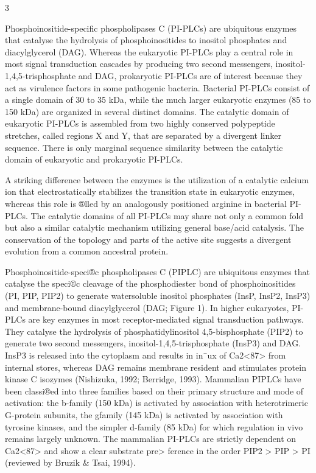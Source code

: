 3

Phosphoinositide-specific phospholipases C (PI-PLCs) are ubiquitous enzymes that catalyse the hydrolysis of phosphoinositides to inositol phosphates and diacylglycerol (DAG). Whereas the eukaryotic PI-PLCs play a central role in most signal transduction cascades by producing two second messengers, inositol-1,4,5-trisphosphate and DAG, prokaryotic PI-PLCs are of interest because they act as virulence factors in some pathogenic bacteria. Bacterial PI-PLCs consist of a single domain of 30 to 35 kDa, while the much larger eukaryotic enzymes (85 to 150 kDa) are organized in several distinct domains. The catalytic domain of eukaryotic PI-PLCs is assembled from two highly conserved polypeptide stretches, called regions X and Y, that are separated by a divergent linker sequence. There is only marginal sequence similarity between the catalytic domain of eukaryotic and prokaryotic PI-PLCs. 



A striking difference between the enzymes is the utilization of a catalytic calcium ion that electrostatically stabilizes the transition state in eukaryotic enzymes, whereas this role is ®lled by an analogously positioned arginine in bacterial PI-PLCs. The catalytic domains of all PI-PLCs may share not only a common fold but also a similar catalytic mechanism utilizing general base/acid catalysis. The conservation of the topology and parts of the active site suggests a divergent evolution from a common ancestral protein.


Phosphoinositide-speci®c phospholipases C (PIPLC) are ubiquitous enzymes that catalyse the speci®c cleavage of the phosphodiester bond of phosphoinositides (PI, PIP, PIP2) to generate watersoluble inositol phosphates (InsP, InsP2, InsP3) and membrane-bound diacylglycerol (DAG; Figure 1). In higher eukaryotes, PI-PLCs are key enzymes in most receptor-mediated signal transduction pathways. They catalyse the hydrolysis of phosphatidylinositol 4,5-bisphosphate (PIP2) to generate two second messengers, inositol-1,4,5-trisphosphate (InsP3) and DAG. InsP3 is released into the cytoplasm and results in in¯ux of Ca2<87> from internal stores, whereas DAG remains membrane resident and stimulates protein kinase C isozymes (Nishizuka, 1992; Berridge, 1993). Mammalian PIPLCs have been classi®ed into three families based on their primary structure and mode of activation: the b-family (150 kDa) is activated by association with heterotrimeric G-protein subunits, the gfamily (145 kDa) is activated by association with tyrosine kinases, and the simpler d-family (85 kDa) for which regulation in vivo remains largely unknown. The mammalian PI-PLCs are strictly dependent on Ca2<87> and show a clear substrate pre> ference in the order PIP2 > PIP > PI (reviewed by Bruzik & Tsai, 1994).


